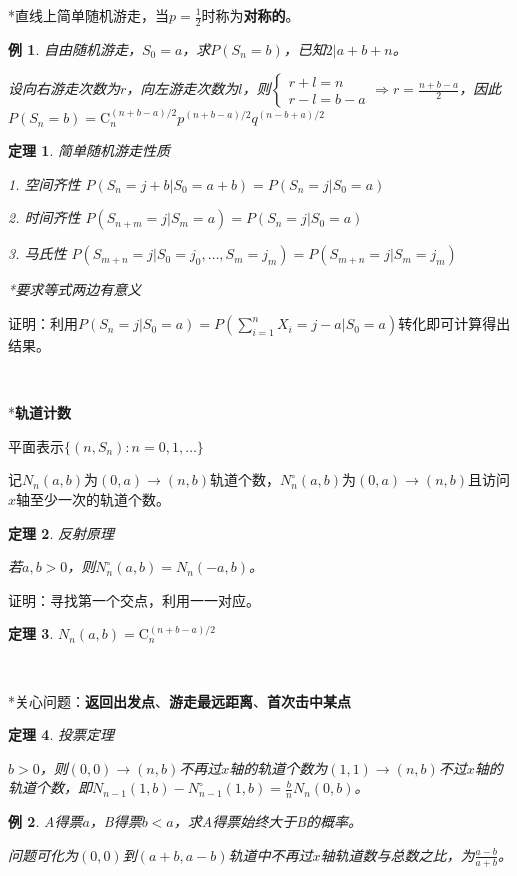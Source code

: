 \documentclass[a4paper,UTF8,fontset=windows]{ctexart}
\newtheorem{thm}{定理}[section]
\newtheorem{exmp}{例}[section]
\begin{document}
*直线上简单随机游走，当$p=\frac{1}{2}$时称为\textbf{对称的}。

\begin{exmp} 自由随机游走，$S_0=a$，求$P(S_n=b)$，已知$2|a+b+n$。

设向右游走次数为$r$，向左游走次数为$l$，则$\begin{cases}
r+l=n\\r-l=b-a\end{cases}\Rightarrow r=\frac{n+b-a}{2}$，因此$P(S_n=b)=\mathrm{C}_n^{(n+b-a)/2}p^{(n+b-a)/2}q^{(n-b+a)/2}$
\end{exmp}

\begin{thm} 简单随机游走性质
	
1. 空间齐性 $P(S_n=j+b|S_0=a+b)=P(S_n=j|S_0=a)$

2. 时间齐性 $P(S_{n+m}=j|S_m=a)=P(S_n=j|S_0=a)$

3. 马氏性 $P(S_{m+n}=j|S_0=j_0,\dots,S_m=j_m)=P(S_{m+n}=j|S_m=j_m)$

*要求等式两边有意义
\end{thm}

证明：利用$P(S_n=j|S_0=a)=P(\sum_{i=1}^nX_i=j-a|S_0=a)$转化即可计算得出结果。

~

*\textbf{轨道计数}

平面表示$\{(n,S_n):n=0,1,\dots\}$

记$N_n(a,b)$为$(0,a)\to(n,b)$轨道个数，$N_n^\circ(a,b)$为$(0,a)\to(n,b)$且访问$x$轴至少一次的轨道个数。

\begin{thm} 反射原理

若$a,b>0$，则$N_n^\circ(a,b)=N_n(-a,b)$。
\end{thm}

证明：寻找第一个交点，利用一一对应。

\begin{thm}
$N_n(a,b)=\mathrm{C}_n^{(n+b-a)/2}$
\end{thm}

~

*关心问题：\textbf{返回出发点}、\textbf{游走最远距离}、\textbf{首次击中某点}

\begin{thm} 投票定理

$b>0$，则$(0,0)\to(n,b)$不再过$x$轴的轨道个数为$(1,1)\to(n,b)$不过$x$轴的轨道个数，即$N_{n-1}(1,b)-N_{n-1}^\circ(1,b)=\frac{b}{n}N_n(0,b)$。
\end{thm}

\begin{exmp}
A得票$a$，B得票$b<a$，求A得票始终大于B的概率。

问题可化为$(0,0)$到$(a+b,a-b)$轨道中不再过$x$轴轨道数与总数之比，为$\frac{a-b}{a+b}$。
\end{exmp}
\end{document}
